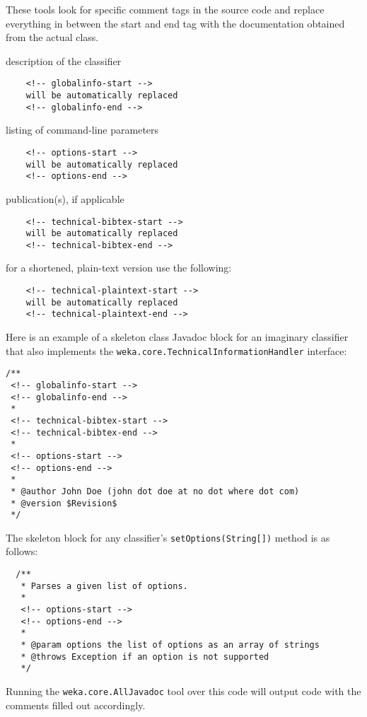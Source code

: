 These tools look for specific comment tags in the source code and replace
everything in between the start and end tag with the documentation obtained
from the actual class.
\begin{tight_itemize}
  \item description of the classifier
    \begin{verbatim}
    <!-- globalinfo-start -->
    will be automatically replaced
    <!-- globalinfo-end -->
    \end{verbatim}
  \item listing of command-line parameters
    \begin{verbatim}
    <!-- options-start -->
    will be automatically replaced
    <!-- options-end -->
   \end{verbatim}
  \item publication(s), if applicable
    \begin{verbatim}
    <!-- technical-bibtex-start -->
    will be automatically replaced
    <!-- technical-bibtex-end -->
    \end{verbatim}
    for a shortened, plain-text version use the following:
    \begin{verbatim}
    <!-- technical-plaintext-start -->
    will be automatically replaced
    <!-- technical-plaintext-end -->
   \end{verbatim}
\end{tight_itemize}

\newpage
\noindent Here is an example of a skeleton class Javadoc block for an imaginary
classifier that also implements the
\texttt{weka.core.TechnicalInformationHandler} interface:
\begin{verbatim}
/**
 <!-- globalinfo-start -->
 <!-- globalinfo-end -->
 *
 <!-- technical-bibtex-start -->
 <!-- technical-bibtex-end -->
 *
 <!-- options-start -->
 <!-- options-end -->
 *
 * @author John Doe (john dot doe at no dot where dot com)
 * @version $Revision$
 */
\end{verbatim}
The skeleton block for any classifier's \texttt{setOptions(String[])} method
is as follows:
\begin{verbatim}
  /**
   * Parses a given list of options.
   *
   <!-- options-start -->
   <!-- options-end -->
   *
   * @param options the list of options as an array of strings
   * @throws Exception if an option is not supported
   */
\end{verbatim}
Running the \texttt{weka.core.AllJavadoc} tool over this code will output code
with the comments filled out accordingly.

